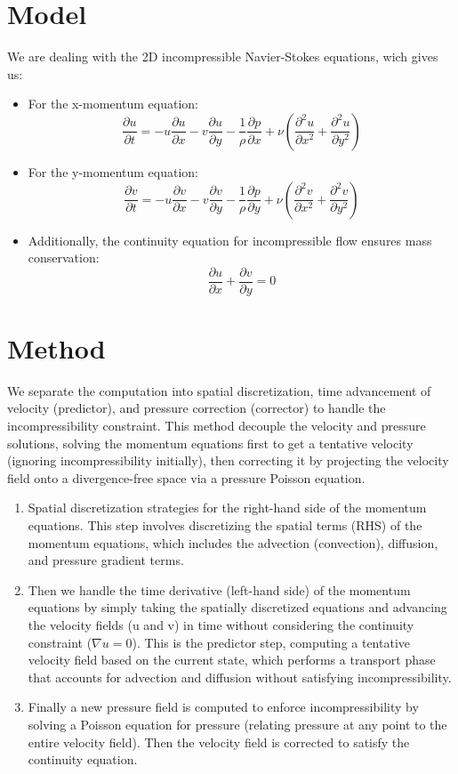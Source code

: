 \section{Model}
We are dealing with the 2D incompressible Navier-Stokes equations, wich gives us:

\begin{itemize}
  \item For the x-momentum equation:
  \[ \frac{\partial u}{\partial t} = -u \frac{\partial u}{\partial x} - v \frac{\partial u}{\partial y} - \frac{1}{\rho} \frac{\partial p}{\partial x} + \nu \left( \frac{\partial^2 u}{\partial x^2} + \frac{\partial^2 u}{\partial y^2} \right) \]
  \item For the y-momentum equation:
  \[ \frac{\partial v}{\partial t} = -u \frac{\partial v}{\partial x} - v \frac{\partial v}{\partial y} - \frac{1}{\rho} \frac{\partial p}{\partial y} + \nu \left( \frac{\partial^2 v}{\partial x^2} + \frac{\partial^2 v}{\partial y^2} \right) \]
  \item Additionally, the continuity equation for incompressible flow ensures mass conservation:
  \[ \frac{\partial u}{\partial x} + \frac{\partial v}{\partial y} = 0 \]
\end{itemize}

\section{Method}

We separate the computation into spatial discretization, time advancement of velocity (predictor), and pressure correction (corrector) to handle the incompressibility constraint.
This method decouple the velocity and pressure solutions, solving the momentum equations first to get a tentative velocity (ignoring incompressibility initially), then correcting it by projecting the velocity field onto a divergence-free space via a pressure Poisson equation.

\begin{enumerate}
    \item Spatial discretization strategies for the right-hand side of the momentum equations. This step involves discretizing the spatial terms (RHS) of the momentum equations, which includes the advection (convection), diffusion, and pressure gradient terms.
    \item Then we handle the time derivative (left-hand side) of the momentum equations by simply taking the spatially discretized equations and advancing the velocity fields (u and v) in time without considering the continuity constraint ($\nabla u=0$). This is the predictor step, computing a tentative velocity field based on the current state, which performs a transport phase that accounts for advection and diffusion without satisfying incompressibility.
    \item Finally a new pressure field is computed to enforce incompressibility by solving a Poisson equation for pressure (relating pressure at any point to the entire velocity field). Then the velocity field is corrected to satisfy the continuity equation.
\end{enumerate}

